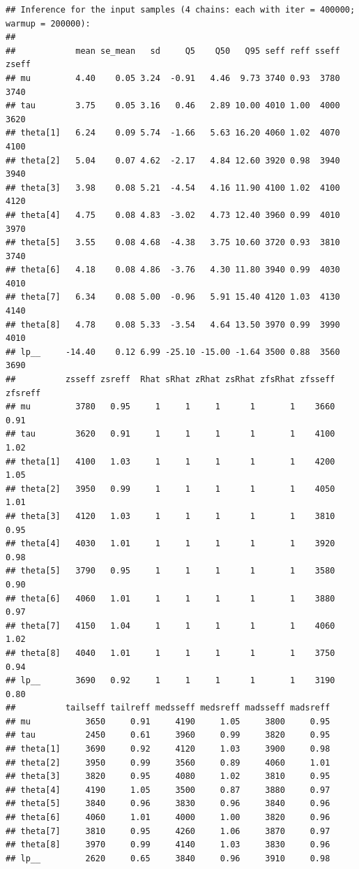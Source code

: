 \documentclass[american,]{article}
\begin{document}
\begin{verbatim}
## Inference for the input samples (4 chains: each with iter = 400000; warmup = 200000):
## 
##            mean se_mean   sd     Q5    Q50   Q95 seff reff sseff zseff
## mu         4.40    0.05 3.24  -0.91   4.46  9.73 3740 0.93  3780  3740
## tau        3.75    0.05 3.16   0.46   2.89 10.00 4010 1.00  4000  3620
## theta[1]   6.24    0.09 5.74  -1.66   5.63 16.20 4060 1.02  4070  4100
## theta[2]   5.04    0.07 4.62  -2.17   4.84 12.60 3920 0.98  3940  3940
## theta[3]   3.98    0.08 5.21  -4.54   4.16 11.90 4100 1.02  4100  4120
## theta[4]   4.75    0.08 4.83  -3.02   4.73 12.40 3960 0.99  4010  3970
## theta[5]   3.55    0.08 4.68  -4.38   3.75 10.60 3720 0.93  3810  3740
## theta[6]   4.18    0.08 4.86  -3.76   4.30 11.80 3940 0.99  4030  4010
## theta[7]   6.34    0.08 5.00  -0.96   5.91 15.40 4120 1.03  4130  4140
## theta[8]   4.78    0.08 5.33  -3.54   4.64 13.50 3970 0.99  3990  4010
## lp__     -14.40    0.12 6.99 -25.10 -15.00 -1.64 3500 0.88  3560  3690
##          zsseff zsreff  Rhat sRhat zRhat zsRhat zfsRhat zfsseff zfsreff
## mu         3780   0.95     1     1     1      1       1    3660    0.91
## tau        3620   0.91     1     1     1      1       1    4100    1.02
## theta[1]   4100   1.03     1     1     1      1       1    4200    1.05
## theta[2]   3950   0.99     1     1     1      1       1    4050    1.01
## theta[3]   4120   1.03     1     1     1      1       1    3810    0.95
## theta[4]   4030   1.01     1     1     1      1       1    3920    0.98
## theta[5]   3790   0.95     1     1     1      1       1    3580    0.90
## theta[6]   4060   1.01     1     1     1      1       1    3880    0.97
## theta[7]   4150   1.04     1     1     1      1       1    4060    1.02
## theta[8]   4040   1.01     1     1     1      1       1    3750    0.94
## lp__       3690   0.92     1     1     1      1       1    3190    0.80
##          tailseff tailreff medsseff medsreff madsseff madsreff
## mu           3650     0.91     4190     1.05     3800     0.95
## tau          2450     0.61     3960     0.99     3820     0.95
## theta[1]     3690     0.92     4120     1.03     3900     0.98
## theta[2]     3950     0.99     3560     0.89     4060     1.01
## theta[3]     3820     0.95     4080     1.02     3810     0.95
## theta[4]     4190     1.05     3500     0.87     3880     0.97
## theta[5]     3840     0.96     3830     0.96     3840     0.96
## theta[6]     4060     1.01     4000     1.00     3820     0.96
## theta[7]     3810     0.95     4260     1.06     3870     0.97
## theta[8]     3970     0.99     4140     1.03     3830     0.96
## lp__         2620     0.65     3840     0.96     3910     0.98
\end{verbatim}
\end{document}
